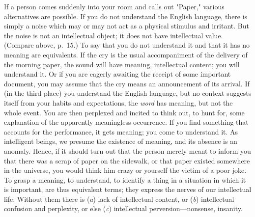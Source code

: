 \documentclass[showtrims,ustradepaper]{memoir}
\begin{document}
If a person comes suddenly into your room and calls out "Paper," various
alternatives are possible. If you do not understand the English
language, there is simply a noise which may or may not act as a physical
stimulus
and irritant. But the noise is not an intellectual object; it does not
have intellectual value. (Compare above, p.\ 15.) To say that you do not
understand it and that it has no meaning are equivalents. If the cry is
the usual accompaniment of the delivery of the morning paper, the sound
will have meaning, intellectual content; you will understand it. Or if
you are eagerly awaiting the receipt of some important document, you may
assume that the cry means an announcement of its arrival. If (in the
third place) you understand the English language, but no context
suggests itself from your habits and expectations, the \emph{word} has
meaning, but not the whole event. You are then perplexed and incited to
think out, to hunt for, some explanation of the apparently meaningless
occurrence. If you find something that accounts for the performance, it
gets meaning; you come to understand it. As intelligent beings, we
presume the existence of meaning, and its absence is an anomaly. Hence,
if it should turn out that the person merely meant to inform you that
there was a scrap of paper on the sidewalk, or that paper existed
somewhere in the universe, you would think him crazy or yourself the
victim of a poor joke. To grasp a meaning, to understand, to identify a
thing in a situation in which it is important, are thus equivalent
terms; they express the nerves of our intellectual life. Without them
there is (\emph{a}) lack of intellectual content, or (\emph{b})
intellectual confusion and perplexity, or else (\emph{c}) intellectual
perversion---nonsense, insanity.

\end{document}

